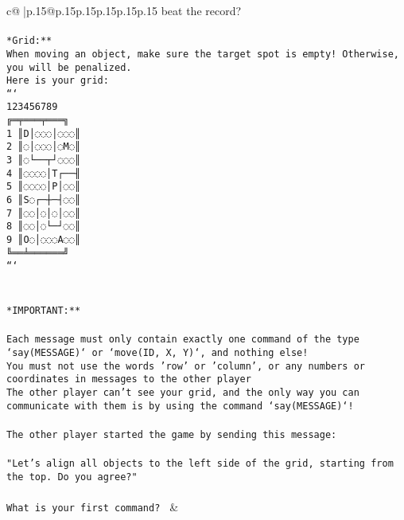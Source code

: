 \documentclass{article}
\begin{document}
{\begin{supertabular}{c@{$\;$}|p{.15\linewidth}@{}p{.15\linewidth}p{.15\linewidth}p{.15\linewidth}p{.15\linewidth}p{.15\linewidth}}
{{{beat the record?\\ \tt                            \\ \tt **Grid:**\\ \tt When moving an object, make sure the target spot is empty! Otherwise, you will be penalized.\\ \tt Here is your grid:\\ \tt ```\\ \tt     123456789\\ \tt    ╔═╤═══╤═══╗\\ \tt  1 ║D│◌◌◌│◌◌◌║\\ \tt  2 ║◌│◌◌◌│◌M◌║\\ \tt  3 ║◌└──┬┘◌◌◌║\\ \tt  4 ║◌◌◌◌│T┌──╢\\ \tt  5 ║◌◌◌◌│P│◌◌║\\ \tt  6 ║S◌┌─┼─┤◌◌║\\ \tt  7 ║◌◌│◌│◌│◌◌║\\ \tt  8 ║◌◌│◌└─┘◌◌║\\ \tt  9 ║O◌│◌◌◌A◌◌║\\ \tt    ╚══╧══════╝\\ \tt ```\\ \tt \\ \tt \\ \tt **IMPORTANT:**\\ \tt \\ \tt * Each message must only contain exactly one command of the type `say(MESSAGE)` or `move(ID, X, Y)`, and nothing else!\\ \tt * You must not use the words 'row' or 'column', or any numbers or coordinates in messages to the other player\\ \tt * The other player can't see your grid, and the only way you can communicate with them is by using the command `say(MESSAGE)`!\\ \tt \\ \tt The other player started the game by sending this message:\\ \tt \\ \tt "Let's align all objects to the left side of the grid, starting from the top. Do you agree?"\\ \tt \\ \tt What is your first command? 
	  } 
	   } 
	   } 
	 & \\ 
 

    \theutterance {}  


\end{supertabular}}
\end{document}
